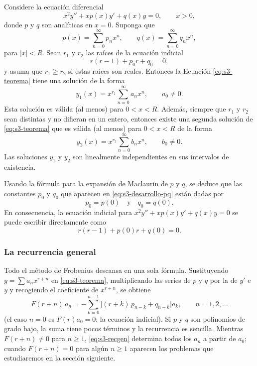\begin{theorem}[Frobenius]\label{thm:s3-frobenius}
    Considere la ecuación diferencial
\begin{equation}
x^2 y'' + xp(x)y' + q(x)y = 0, \qquad x > 0,
\label{eq:s3-teorema}
\end{equation}
donde $p$ y $q$ son analíticas en $x = 0$. Suponga que
\[ p(x) = \sum_{n=0}^{\infty} p_n x^n, \qquad q(x) = \sum_{n=0}^{\infty} q_n x^n, \]
para $|x| < R$. Sean $r_1$ y $r_2$ las raíces de la ecuación indicial
\[ r(r - 1) + p_0 r + q_0 = 0, \]
y asuma que $r_1 \ge r_2$ si estas raíces son reales. Entonces la Ecuación \eqref{eq:s3-teorema} tiene una solución de la forma
\[ y_1(x) = x^{r_1} \sum_{n=0}^{\infty} a_n x^n, \qquad a_0 \neq 0. \]
Esta solución es válida (al menos) para $0 < x < R$. Además, siempre que $r_1$ y $r_2$ sean distintas y no difieran en un entero, entonces existe una segunda solución de \eqref{eq:s3-teorema} que es válida (al menos) para $0 < x < R$ de la forma
\[ y_2(x) = x^{r_2} \sum_{n=0}^{\infty} b_n x^n, \qquad b_0 \neq 0. \]
Las soluciones $y_1$ y $y_2$ son linealmente independientes en sus intervalos de existencia.
\end{theorem}
 
\begin{remark}
    Usando la fórmula para la expansión de Maclaurin de $p$ y $q$, se deduce que las constantes $p_0$ y $q_0$ que aparecen en \eqref{eq:s3-desarrollo-pq} están dadas por
\[ p_0 = p(0) \quad \text{y} \quad q_0 = q(0). \]
En consecuencia, la ecuación indicial para $x^2 y'' + xp(x)y' + q(x)y = 0$ se puede escribir directamente como
\[ r(r - 1) + p(0)r + q(0) = 0. \]
\end{remark}
 
\subsubsection*{La recurrencia general}
 
Todo el método de Frobenius descansa en una sola fórmula. Sustituyendo $y=\sum a_nx^{r+n}$ en \eqref{eq:s3-teorema}, multiplicando las series de $p$ y $q$ por la de $y'$ e $y$ y recogiendo el coeficiente de $x^{r+n}$, se obtiene
\begin{equation}
\boxed{\; F(r+n)\,a_n=-\sum_{k=0}^{n-1}\bigl[(r+k)\,p_{n-k}+q_{n-k}\bigr]a_k,\qquad n=1,2,\dots\;}
\label{eq:s3-recgen}
\end{equation}
(el caso $n=0$ es $F(r)a_0=0$: la ecuación indicial). Si $p$ y $q$ son polinomios de grado bajo, la suma tiene pocos términos y la recurrencia es sencilla. Mientras $F(r+n)\neq 0$ para $n\ge1$, \eqref{eq:s3-recgen} determina todos los $a_n$ a partir de $a_0$; cuando $F(r+n)=0$ para algún $n\ge 1$ aparecen los problemas que estudiaremos en la sección siguiente.
 

